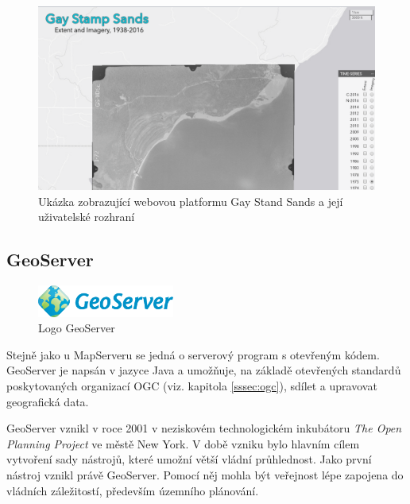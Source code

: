 \begin{figure}[h!]  \centering
\includegraphics[width=1\textwidth]{./img/gay-sands.png}
	\caption{Ukázka zobrazující webovou platformu Gay Stand
Sands a její uživatelské rozhraní \cite{gay-sands}}
	\label{fig:gay-sands}
\end{figure}

\newpage
\subsection{GeoServer}
\label{sssec:geoserver}

\begin{figure}[h!]  \centering
\includegraphics[width=0.4\textwidth]{./img/geoserver-logo.png}
	\caption{Logo GeoServer 
	\cite{geoserver-layer-edit}}
	\label{fig:geoserver-logo}
\end{figure} \bigskip

Stejně jako u MapServeru se jedná o serverový program s otevřeným
kódem. GeoServer je napsán v jazyce Java a umožňuje, na základě
otevřených standardů poskytovaných organizací OGC (viz. kapitola \ref{sssec:ogc}), sdílet a upravovat
geografická data.

GeoServer vznikl v roce 2001 v neziskovém technologickém inkubátoru
\textit{The Open Planning Project} ve městě New York. V době vzniku bylo
hlavním cílem vytvoření sady nástrojů, které umožní větší vládní
průhlednost. Jako první nástroj vznikl právě GeoServer. Pomocí něj
mohla být veřejnost lépe zapojena do vládních záležitostí, především
územního plánování.

